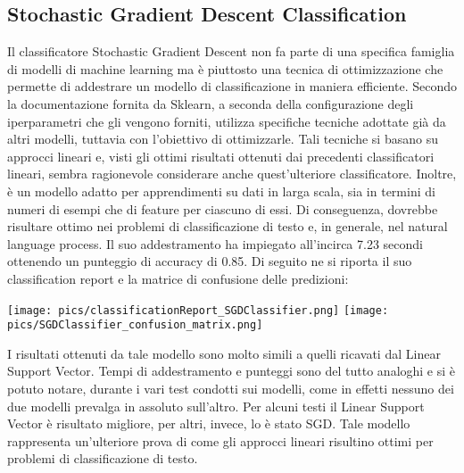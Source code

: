 \documentclass[12pt,oneside]{article}
\begin{document}
   \begin{enumerate}
    \subsection{Stochastic Gradient Descent Classification}
    \begin{justify}
    Il classificatore Stochastic Gradient Descent non fa parte di una specifica famiglia di modelli di machine learning ma è piuttosto una tecnica di ottimizzazione che permette di addestrare un modello di classificazione in maniera efficiente. Secondo la documentazione fornita da Sklearn, a seconda della configurazione degli iperparametri che gli vengono forniti, utilizza specifiche tecniche adottate già da altri modelli, tuttavia con l’obiettivo di ottimizzarle. Tali tecniche si basano su approcci lineari e, visti gli ottimi risultati ottenuti dai precedenti classificatori lineari, sembra ragionevole considerare anche quest’ulteriore classificatore. Inoltre, è un modello adatto per apprendimenti su dati in larga scala, sia in termini di numeri di esempi che di feature per ciascuno di essi. Di conseguenza, dovrebbe risultare ottimo nei problemi di classificazione di testo e, in generale, nel natural language process.
    Il suo addestramento ha impiegato all’incirca 7.23 secondi ottenendo un punteggio di accuracy di 0.85. Di seguito ne si riporta il suo classification report e la matrice di confusione delle predizioni:
    \end{justify}

    \texttt{[image: pics/classificationReport\_SGDClassifier.png]}
    \texttt{[image: pics/SGDClassifier\_confusion\_matrix.png]}

    \begin{justify}
    I risultati ottenuti da tale modello sono molto simili a quelli ricavati dal Linear Support Vector. Tempi di addestramento e punteggi sono del tutto analoghi e si è potuto notare, durante i vari test condotti sui modelli, come in effetti nessuno dei due modelli prevalga in assoluto sull’altro. Per alcuni testi il Linear Support Vector è risultato migliore, per altri, invece, lo è stato SGD. Tale modello rappresenta un’ulteriore prova di come gli approcci lineari risultino ottimi per problemi di classificazione di testo.
    \end{justify}
    \end{enumerate}
    
\end{document}
